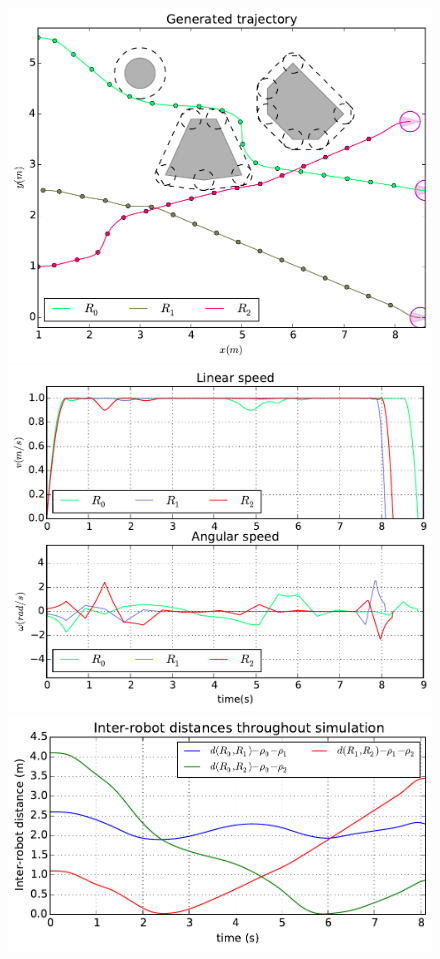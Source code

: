 \documentclass[eprint]{actapoly}
\begin{document}
\begin{figure}\centering
  \includegraphics[width=\linewidth]{./images/no_collision/multirobot-path2.pdf} 
  \\[1mm]
  \includegraphics[width=\linewidth]{./images/no_collision/multirobot-vw.pdf} %
  \includegraphics[width=\linewidth]{./images/no_collision/multirobot-interr.pdf} %

\end{figure}
\end{document}
